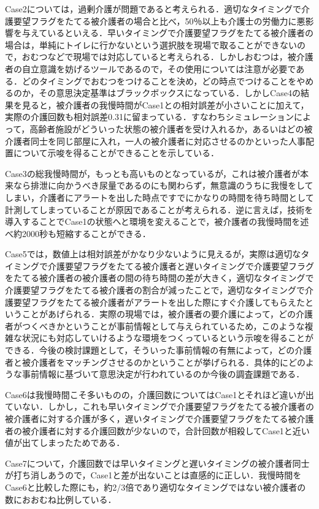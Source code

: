 Case2については，過剰介護が問題であると考えられる．適切なタイミングで介護要望フラグをたてる被介護者の場合と比べ，50％以上も介護士の労働力に悪影響を与えているといえる．早いタイミングで介護要望フラグをたてる被介護者の場合は，単純にトイレに行かないという選択肢を現場で取ることができないので，おむつなどで現場では対応していると考えられる．しかしおむつは，被介護者の自立意識を妨げるツールであるので，その使用については注意が必要である．どのタイミングでおむつをつけることを決め，どの時点でつけることをやめるのか，その意思決定基準はブラックボックスになっている．しかしCase4の結果を見ると，被介護者の我慢時間がCase1との相対誤差が小さいことに加えて，実際の介護回数も相対誤差0.31に留まっている．すなわちシミュレーションによって，高齢者施設がどういった状態の被介護者を受け入れるか，あるいはどの被介護者同士を同じ部屋に入れ，一人の被介護者に対応させるのかといった人事配置について示唆を得ることができることを示している．

Case3の総我慢時間が，もっとも高いものとなっているが，これは被介護者が本来なら排泄に向かうべき尿量であるのにも関わらず，無意識のうちに我慢をしてしまい，介護者にアラートを出した時点ですでにかなりの時間を待ち時間として計測してしまっていることが原因であることが考えられる．逆に言えば，技術を導入することでCase1の状態へと環境を変えることで，被介護者の我慢時間を述べ約2000秒も短縮することができる．

Case5では，数値上は相対誤差がかなり少ないように見えるが，実際は適切なタイミングで介護要望フラグをたてる被介護者と遅いタイミングで介護要望フラグをたてる被介護者の被介護者の間の待ち時間の差が大きく，適切なタイミングで介護要望フラグをたてる被介護者の割合が減ったことで，適切なタイミングで介護要望フラグをたてる被介護者がアラートを出した際にすぐ介護してもらえたということがあげられる．実際の現場では，被介護者の要介護によって，どの介護者がつくべきかということが事前情報として与えられているため，このような複雑な状況にも対応していけるような環境をつくっているという示唆を得ることができる．今後の検討課題として，そういった事前情報の有無によって，どの介護者と被介護者をマッチングさせるのかということが挙げられる．具体的にどのような事前情報に基づいて意思決定が行われているのか今後の調査課題である．

Case6は我慢時間こそ多いものの，介護回数についてはCase1とそれほど違いが出ていない．しかし，これも早いタイミングで介護要望フラグをたてる被介護者の被介護者に対する介護が多く，遅いタイミングで介護要望フラグをたてる被介護者の被介護者に対する介護回数が少ないので，合計回数が相殺してCase1と近い値が出てしまったためである．

Case7について，介護回数では早いタイミングと遅いタイミングの被介護者同士が打ち消しあうので，Case1と差が出ないことは直感的に正しい．我慢時間をCase6と比較した際にも，約2/3倍であり適切なタイミングではない被介護者の数におおむね比例している．
